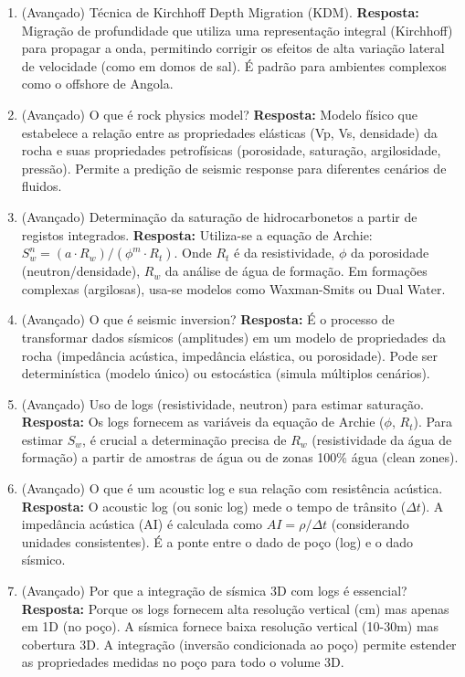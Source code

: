 \documentclass[11pt,a4paper]{article}
\begin{document}
\begin{enumerate}
  \item (Avançado) Técnica de Kirchhoff Depth Migration (KDM).
  \textbf{Resposta:} Migração de profundidade que utiliza uma representação integral (Kirchhoff) para propagar a onda, permitindo corrigir os efeitos de alta variação lateral de velocidade (como em domos de sal). É padrão para ambientes complexos como o offshore de Angola.

  \item (Avançado) O que é rock physics model?
  \textbf{Resposta:} Modelo físico que estabelece a relação entre as propriedades elásticas (Vp, Vs, densidade) da rocha e suas propriedades petrofísicas (porosidade, saturação, argilosidade, pressão). Permite a predição de seismic response para diferentes cenários de fluidos.

  \item (Avançado) Determinação da saturação de hidrocarbonetos a partir de registos integrados.
  \textbf{Resposta:} Utiliza-se a equação de Archie: $S_w^n = (a \cdot R_w) / (\phi^m \cdot R_t)$. Onde $R_t$ é da resistividade, $\phi$ da porosidade (neutron/densidade), $R_w$ da análise de água de formação. Em formações complexas (argilosas), usa-se modelos como Waxman-Smits ou Dual Water.

  \item (Avançado) O que é seismic inversion?
  \textbf{Resposta:} É o processo de transformar dados sísmicos (amplitudes) em um modelo de propriedades da rocha (impedância acústica, impedância elástica, ou porosidade). Pode ser determinística (modelo único) ou estocástica (simula múltiplos cenários).

  \item (Avançado) Uso de logs (resistividade, neutron) para estimar saturação.
  \textbf{Resposta:} Os logs fornecem as variáveis da equação de Archie ($\phi$, $R_t$). Para estimar $S_w$, é crucial a determinação precisa de $R_w$ (resistividade da água de formação) a partir de amostras de água ou de zonas 100\% água (clean zones).

  \item (Avançado) O que é um acoustic log e sua relação com resistência acústica.
  \textbf{Resposta:} O acoustic log (ou sonic log) mede o tempo de trânsito ($\Delta t$). A impedância acústica (AI) é calculada como $AI = \rho / \Delta t$ (considerando unidades consistentes). É a ponte entre o dado de poço (log) e o dado sísmico.

  \item (Avançado) Por que a integração de sísmica 3D com logs é essencial?
  \textbf{Resposta:} Porque os logs fornecem alta resolução vertical (cm) mas apenas em 1D (no poço). A sísmica fornece baixa resolução vertical (10-30m) mas cobertura 3D. A integração (inversão condicionada ao poço) permite estender as propriedades medidas no poço para todo o volume 3D.


\end{enumerate}
\end{document}
